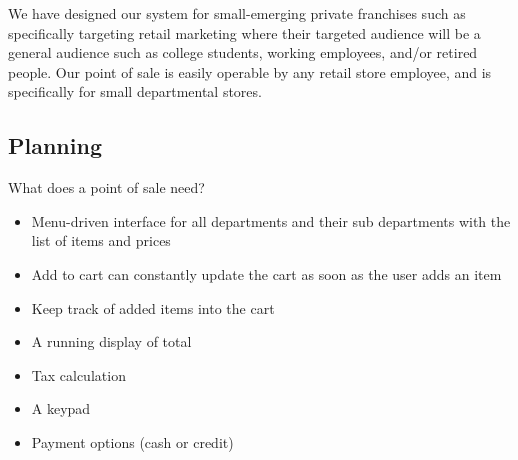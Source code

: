 \documentclass[10pt,conference,onecolumn,compsoc]{IEEEtran}
\begin{document}
	We have designed our system for small-emerging private franchises such as specifically targeting retail marketing where their targeted audience will be a general audience such as college students, working employees, and/or retired people. Our point of sale is easily operable by any retail store employee, and  is specifically for small departmental stores.






\subsection{Planning}
What does a point of sale need? 
\begin{itemize}
\item Menu-driven interface for all departments and their sub departments with the list of items and prices
\item Add to cart can constantly update the cart as soon as the user adds an item
\item Keep track of added items into the cart
\item A running display of total
\item Tax calculation
\item A keypad
\item Payment options (cash or credit)
\end{itemize}




 
\end{document}
